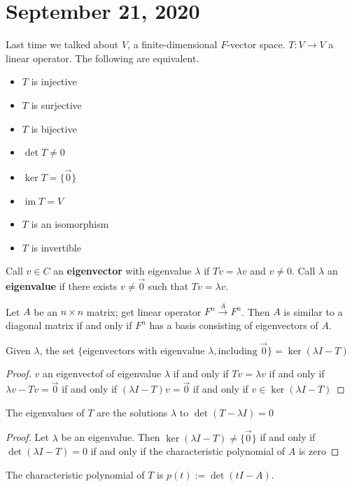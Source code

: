 \documentclass{article}
\newcommand{\vocab}[1]{\textbf{\color{blue!90}\boldmath #1}}
\newcommand{\ra}[1][]{\xrightarrow{#1}}
\DeclareMathOperator{\im}{im}
\begin{document}
\section{September 21, 2020}
Last time we talked about $V$, a finite-dimensional $F$-vector space. $T:V\ra V$ a linear operator. The following are equivalent.
\begin{itemize}
    \item $T$ is injective
    \item $T$ is surjective
    \item $T$ is bijective
    \item $\det T\neq 0$
    \item $\ker T=\{\vec{0}\}$
    \item $\im T=V$
    \item $T$ is an isomorphism
    \item $T$ is invertible
\end{itemize}
\begin{definition}
Call $v\in C$ an \vocab{eigenvector} with eigenvalue $\lambda$ if $Tv=\lambda v$ and $v\neq0$. Call $\lambda$ an \vocab{eigenvalue} if there exists $v\neq \vec{0}$ such that $Tv=\lambda v$.
\end{definition}
\begin{proposition}
Let $A$ be an $n\times n$ matrix; get linear operator $F^n\ra[A]F^n$. Then $A$ is similar to a diagonal matrix if and only if $F^n$ has a basis consisting of eigenvectors of $A$.
\end{proposition}
\begin{definition}
Given $\lambda$, the set $\{\textrm{eigenvectors with eigenvalue } \lambda, \textrm{including }\vec{0}\}=\ker(\lambda I-T)$
\end{definition}
\begin{proof}
$v$ an eigenvectof of eigenvalue $\lambda$ if and only if $Tv=\lambda v$ if and only if $\lambda v-Tv=\vec{0}$ if and only if $(\lambda I-T)v=\vec{0}$ if and only if $v\in\ker(\lambda I-T)$
\end{proof}
\begin{proposition}
The eigenvalues of $T$ are the solutions $\lambda$ to $\det(T-\lambda I)=0$
\end{proposition}
\begin{proof}
Let $\lambda$ be an eigenvalue. Then $\ker(\lambda I-T)\neq \{\vec{0}\}$ if and only if $\det(\lambda I-T)=0$ if and only if the characteristic polynomial of $A$ is zero
\end{proof}
\begin{definition}
The characteristic polynomial of $T$ is $p(t):=\det(t I-A)$.
\end{definition}
\end{document}

